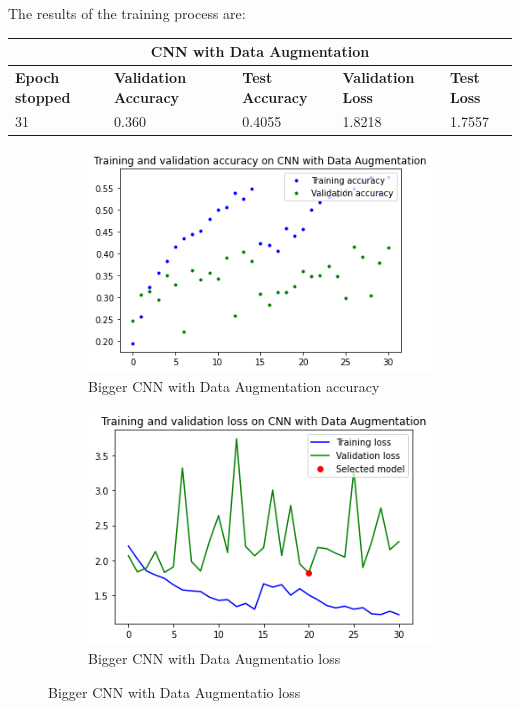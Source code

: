 \noindent The results of the training process are: 

\medskip

\begin{tabular}{ |p{2cm}|p{2cm}|p{2cm}|p{2cm}|p{2cm}|  }
\hline
\multicolumn{5}{|c|}{CNN with Data Augmentation} \\
\hline
\textbf{Epoch stopped} & \textbf{Validation Accuracy} & \textbf{Test Accuracy} & \textbf{Validation Loss} & \textbf{Test Loss} \\
\hline
31 & 0.360 & 0.4055 & 1.8218 & 1.7557\\
\hline
\end{tabular}

\medskip


\begin{figure}[H]
	\begin{subfigure}{0.5\textwidth}
		\includegraphics[width=0.9\linewidth]{img/scratch/data_augmentation_acc.png} 
		\caption{Bigger CNN with Data Augmentation accuracy}
		\label{fig:DataAugmentationacc}
	\end{subfigure}
	\begin{subfigure}{0.5\textwidth}
		\includegraphics[width=0.9\linewidth]{img/scratch/data_augmentation_loss.png}
		\caption{Bigger CNN with Data Augmentatio loss}
		\label{fig:DataAugmentationloss}
	\end{subfigure}
\end{figure}

